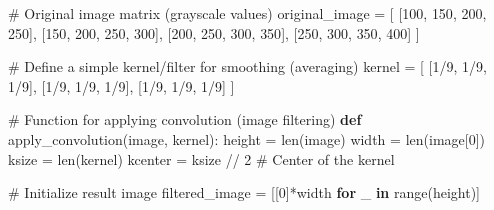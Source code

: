 \documentclass[
  letterpaper,
  DIV=11,
  numbers=noendperiod]{scrreprt}
\newenvironment{Shaded}{\begin{snugshade}}{\end{snugshade}}
\newcommand{\BuiltInTok}[1]{\textcolor[rgb]{0.00,0.23,0.31}{#1}}
\newcommand{\CommentTok}[1]{\textcolor[rgb]{0.37,0.37,0.37}{#1}}
\newcommand{\ControlFlowTok}[1]{\textcolor[rgb]{0.00,0.23,0.31}{\textbf{#1}}}
\newcommand{\DecValTok}[1]{\textcolor[rgb]{0.68,0.00,0.00}{#1}}
\newcommand{\KeywordTok}[1]{\textcolor[rgb]{0.00,0.23,0.31}{\textbf{#1}}}
\newcommand{\NormalTok}[1]{\textcolor[rgb]{0.00,0.23,0.31}{#1}}
\newcommand{\OperatorTok}[1]{\textcolor[rgb]{0.37,0.37,0.37}{#1}}
\theoremstyle{plain}
\theoremstyle{definition}
\theoremstyle{remark}
\begin{document}
\begin{Shaded}
\begin{Highlighting}[]
\CommentTok{\# Original image matrix (grayscale values)}
\NormalTok{original\_image }\OperatorTok{=}\NormalTok{ [}
\NormalTok{    [}\DecValTok{100}\NormalTok{, }\DecValTok{150}\NormalTok{, }\DecValTok{200}\NormalTok{, }\DecValTok{250}\NormalTok{],}
\NormalTok{    [}\DecValTok{150}\NormalTok{, }\DecValTok{200}\NormalTok{, }\DecValTok{250}\NormalTok{, }\DecValTok{300}\NormalTok{],}
\NormalTok{    [}\DecValTok{200}\NormalTok{, }\DecValTok{250}\NormalTok{, }\DecValTok{300}\NormalTok{, }\DecValTok{350}\NormalTok{],}
\NormalTok{    [}\DecValTok{250}\NormalTok{, }\DecValTok{300}\NormalTok{, }\DecValTok{350}\NormalTok{, }\DecValTok{400}\NormalTok{]}
\NormalTok{]}

\CommentTok{\# Define a simple kernel/filter for smoothing (averaging)}
\NormalTok{kernel }\OperatorTok{=}\NormalTok{ [}
\NormalTok{    [}\DecValTok{1}\OperatorTok{/}\DecValTok{9}\NormalTok{, }\DecValTok{1}\OperatorTok{/}\DecValTok{9}\NormalTok{, }\DecValTok{1}\OperatorTok{/}\DecValTok{9}\NormalTok{],}
\NormalTok{    [}\DecValTok{1}\OperatorTok{/}\DecValTok{9}\NormalTok{, }\DecValTok{1}\OperatorTok{/}\DecValTok{9}\NormalTok{, }\DecValTok{1}\OperatorTok{/}\DecValTok{9}\NormalTok{],}
\NormalTok{    [}\DecValTok{1}\OperatorTok{/}\DecValTok{9}\NormalTok{, }\DecValTok{1}\OperatorTok{/}\DecValTok{9}\NormalTok{, }\DecValTok{1}\OperatorTok{/}\DecValTok{9}\NormalTok{]}
\NormalTok{]}

\CommentTok{\# Function for applying convolution (image filtering)}
\KeywordTok{def}\NormalTok{ apply\_convolution(image, kernel):}
\NormalTok{    height }\OperatorTok{=} \BuiltInTok{len}\NormalTok{(image)}
\NormalTok{    width }\OperatorTok{=} \BuiltInTok{len}\NormalTok{(image[}\DecValTok{0}\NormalTok{])}
\NormalTok{    ksize }\OperatorTok{=} \BuiltInTok{len}\NormalTok{(kernel)}
\NormalTok{    kcenter }\OperatorTok{=}\NormalTok{ ksize }\OperatorTok{//} \DecValTok{2}  \CommentTok{\# Center of the kernel}

    \CommentTok{\# Initialize result image}
\NormalTok{    filtered\_image }\OperatorTok{=}\NormalTok{ [[}\DecValTok{0}\NormalTok{]}\OperatorTok{*}\NormalTok{width }\ControlFlowTok{for}\NormalTok{ \_ }\KeywordTok{in} \BuiltInTok{range}\NormalTok{(height)]}


\end{Highlighting}
\end{Shaded}
\end{document}
